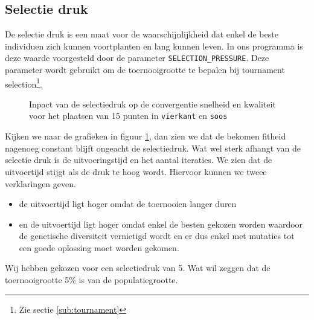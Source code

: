 \subsection{Selectie druk}
\label{sub:selection_pressure}
De selectie druk is een maat voor de waarschijnlijkheid dat enkel de beste individuen zich kunnen voortplanten en lang kunnen leven. In ons programma is deze waarde voorgesteld door de parameter \texttt{SELECTION\_PRESSURE}. Deze parameter wordt gebruikt om de toernooigrootte te bepalen bij tournament selection\footnote{Zie sectie \ref{sub:tournament}}.
\begin{figure}[H]


\caption{Inpact van de selectiedruk op de convergentie snelheid en kwaliteit voor het plaatsen van 15 punten in \texttt{vierkant} en \texttt{soos}}
\label{graf:selectionPressure}
\end{figure}
Kijken we naar de grafieken in figuur \ref{graf:selectionPressure}, dan zien we dat de bekomen fitheid nagenoeg constant blijft ongeacht de selectiedruk. Wat wel sterk afhangt van de selectie druk is de uitvoeringstijd en het aantal iteraties. We zien dat de uitvoertijd stijgt als de druk te hoog wordt. Hiervoor kunnen we tweee verklaringen geven. \begin{itemize}\item de uitvoertijd ligt hoger omdat de toernooien langer duren \item en de uitvoertijd ligt hoger omdat enkel de besten gekozen worden waardoor de genetische diversiteit vernietigd wordt en er dus enkel met mutaties tot een goede oplossing moet worden gekomen.\end{itemize}

Wij hebben gekozen voor een selectiedruk van 5. Wat wil zeggen dat de toernooigrootte 5\% is van de populatiegrootte.


